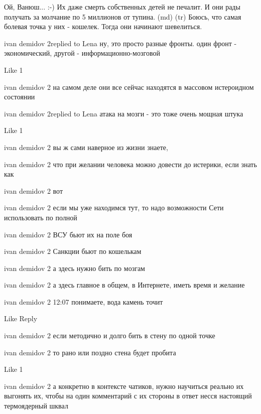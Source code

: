  
 
 
 
 

Ой, Ванюш... :-) Их даже смерть собственных детей не печалит. И они рады получать за молчание по 5 миллионов от тупина. (md) (tr) Боюсь, что самая болевая точка у них - кошелек. Тогда они начинают шевелиться.

ivan demidov 2replied to Lena
ну, это просто разные фронты. один фронт - экономический, другой - информационно-мозговой

    Like 1

ivan demidov 2
на самом деле они все сейчас находятся в массовом истероидном состоянии

ivan demidov 2replied to Lena
атака на мозги - это тоже очень мощная штука

    Like 1

ivan demidov 2
вы ж сами наверное из жизни знаете,

ivan demidov 2
что при желании человека можно довести до истерики, если знать как

ivan demidov 2
вот

ivan demidov 2
если мы уже находимся тут, то надо возможности Сети использовать по полной

ivan demidov 2
ВСУ бьют их на поле боя

ivan demidov 2
Санкции бьют по кошелькам

ivan demidov 2
а здесь нужно бить по мозгам

ivan demidov 2
а здесь главное в общем, в Интернете, иметь время и желание

ivan demidov 2
12:07
понимаете, вода камень точит

    Like
    Reply

ivan demidov 2
если методично и долго бить в стену по одной точке

ivan demidov 2
то рано или поздно стена будет пробита

    Like 1

ivan demidov 2
а конкретно в контексте чатиков, нужно научиться реально их выгонять их, чтобы на один комментарий с их стороны в ответ несся настоящий термоядерный шквал
